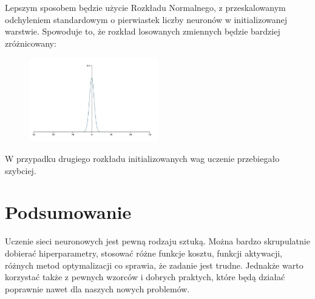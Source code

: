 \documentclass{article}
\begin{document}
	Lepszym sposobem będzie użycie Rozkładu Normalnego, z przeskalowanym odchyleniem standardowym o pierwiastek liczby neuronów w initializowanej warstwie. Spowoduje to, że rozkład losowanych zmiennych będzie bardziej zróżnicowany:
	
	 \begin{figure}[h]
		\centering
		\caption{}
		\includegraphics[width=0.5\textwidth]{gauss2.jpg}
	\end{figure}
	
	W przypadku drugiego rozkładu initializowanych wag uczenie przebiegało szybciej.
\newpage	
	\section{Podsumowanie}
	
	Uczenie sieci neuronowych jest pewną rodzaju sztuką. Można bardzo skrupulatnie dobierać hiperparametry, stosować różne funkcje kosztu, funkcji aktywacji, różnych metod optymalizacji co sprawia, że zadanie jest trudne. Jednakże warto korzystać także z pewnych wzorców i dobrych praktych, które będą działać poprawnie nawet dla naszych nowych problemów. 
\end{document}
